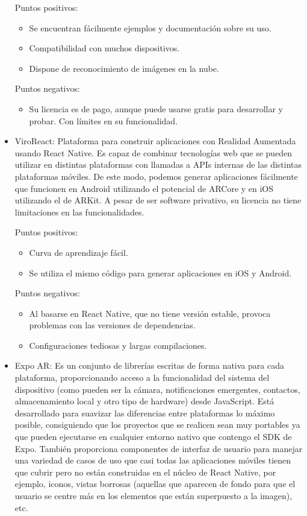 \begin{itemize}
    Puntos positivos:
    \begin{itemize}
        \item Se encuentran fácilmente ejemplos y documentación sobre su uso.
        \item Compatibilidad con muchos dispositivos.
        \item Dispone de reconocimiento de imágenes en la nube.
    \end{itemize}
    Puntos negativos:
    \begin{itemize}
        \item Su licencia es de pago, aunque puede usarse gratis para desarrollar y
        probar. Con límites en su funcionalidad.
    \end{itemize}


    \item ViroReact\cite{viroreact}:
    Plataforma para construir aplicaciones con Realidad Aumentada usando
    React Native. Es capaz de combinar tecnologías web que se pueden utilizar
    en distintas plataformas con llamadas a APIs internas de las distintas
    plataformas móviles. De este modo, podemos generar aplicaciones fácilmente
    que funcionen en Android utilizando el potencial de ARCore y en iOS
    utilizando el de ARKit.
    A pesar de ser software privativo, su licencia no tiene limitaciones en
    las funcionalidades.

    Puntos positivos:
    \begin{itemize}
        \item Curva de aprendizaje fácil.
        \item Se utiliza el mismo código para generar aplicaciones en iOS y
        Android.
    \end{itemize}
    Puntos negativos:
    \begin{itemize}
        \item Al basarse en React Native, que no tiene versión estable,
        provoca problemas con las versiones de dependencias.
        \item Configuraciones tediosas y largas compilaciones.
    \end{itemize}


    \item Expo AR\cite{expoar}:
    Es un conjunto de librerías escritas de forma nativa para cada plataforma,
    proporcionando acceso a la funcionalidad del sistema del
    dispositivo (como pueden ser la cámara, notificaciones emergentes,
    contactos, almacenamiento local y otro tipo de hardware) desde JavaScript.
    Está desarrollado para suavizar las diferencias entre plataformas lo máximo
    posible, consiguiendo que los proyectos que se realicen sean muy portables
    ya que pueden ejecutarse en cualquier entorno nativo que contengo el SDK de
    Expo.
    También proporciona componentes de interfaz de usuario para manejar una
    variedad de casos de uso que casi todas las aplicaciones móviles tienen que
    cubrir pero no están construidas en el núcleo de React Native, por ejemplo,
    iconos, vistas borrosas (aquellas que aparecen de fondo para que el usuario
    se centre más en los elementos que están superpuesto a la imagen), etc.


\end{itemize}
